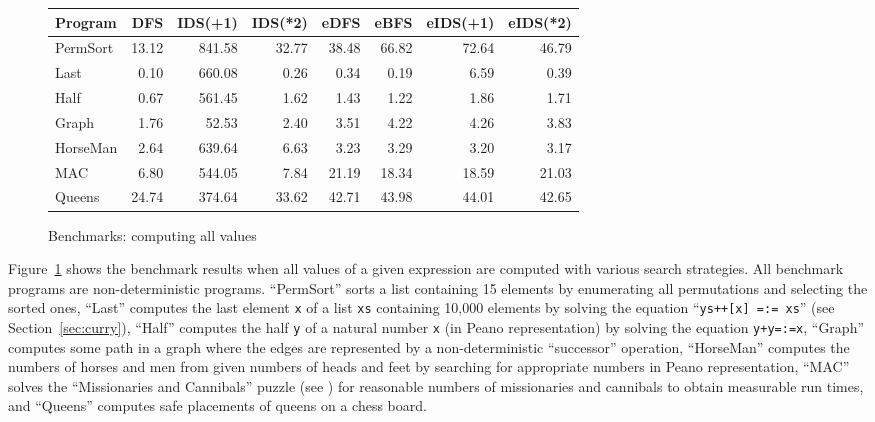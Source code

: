 \documentclass[english]{lni}
\newcommand{\code}[1]{\texttt{\small{}#1}}
\newcommand{\ccode}[1]{``\code{#1}''}
\begin{document}
\begin{figure}[ht]
\centering
\begin{tabular}{|@{~~}l@{~~}|*{7}{@{~~}r@{~~}|}}
\hline
Program  &   DFS  & IDS(+1)& IDS(*2)&  eDFS  &  eBFS  &eIDS(+1)&eIDS(*2)\\
\hline
PermSort &  13.12 & 841.58 &  32.77 &  38.48 &  66.82 &  72.64 &  46.79 \\
Last     &   0.10 & 660.08 &   0.26 &   0.34 &   0.19 &   6.59 &   0.39 \\
Half     &   0.67 & 561.45 &   1.62 &   1.43 &   1.22 &   1.86 &   1.71 \\
Graph    &   1.76 &  52.53 &   2.40 &   3.51 &   4.22 &   4.26 &   3.83 \\
HorseMan &   2.64 & 639.64 &   6.63 &   3.23 &   3.29 &   3.20 &   3.17 \\
MAC      &   6.80 & 544.05 &   7.84 &  21.19 &  18.34 &  18.59 &  21.03 \\
Queens   &  24.74 & 374.64 &  33.62 &  42.71 &  43.98 &  44.01 &  42.65 \\
\hline
\end{tabular}
\caption{Benchmarks: computing all values}
\label{fig:bench-all-solutions}
\end{figure}

Figure~\ref{fig:bench-all-solutions} shows the benchmark results
when all values of a given expression are computed
with various search strategies.
All benchmark programs are non-deterministic programs.
``PermSort'' sorts a list containing 15 elements by enumerating
all permutations and selecting the sorted ones,
``Last'' computes the last element \code{x}
of a list \code{xs} containing 10,000 elements
by solving the equation \ccode{ys++[x] =:= xs}
(see Section~\ref{sec:curry}),
``Half'' computes the half \code{y} of a natural number \code{x}
(in Peano representation) by solving the equation \code{y+y=:=x},
``Graph'' computes some path in a graph where the edges
are represented by a non-deterministic ``successor'' operation,
``HorseMan'' computes the numbers of horses and men
from given numbers of heads and feet by searching for
appropriate numbers in Peano representation,
``MAC'' solves the ``Missionaries and Cannibals'' puzzle
(see \cite[Sect.~3.1]{AntoyHanus02FLOPS})
for reasonable numbers of missionaries and cannibals
to obtain measurable run times,
and ``Queens'' computes safe placements of queens on a chess board.
\end{document}
